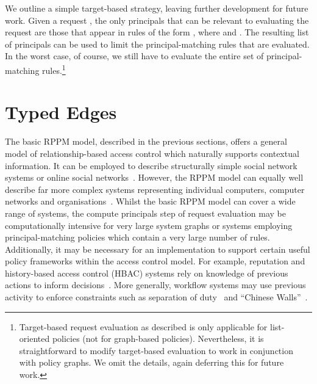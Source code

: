 \documentclass{article}
\begin{document}
We outline a simple target-based strategy, leaving further development for future work.
Given a request , the only principals that can be relevant to evaluating the request are those that appear in rules of the form , where  and .
The resulting list of principals can be used to limit the principal-matching rules that are evaluated.
In the worst case, of course, we still have to evaluate the entire set of principal-matching rules.\footnote{Target-based request evaluation as described is only applicable for list-oriented policies (not for graph-based policies). Nevertheless, it is straightforward to modify target-based evaluation to work in conjunction with policy graphs.  We omit the details, again deferring this for future work.}

\section{Typed Edges}\label{sec:extended_typed_edges}
The basic RPPM model, described in the previous sections, offers a general model of relationship-based access control which naturally supports contextual information.
It can be employed to describe structurally simple social network systems or online social networks~\cite{ChengPS12passat,ChengPS12dbsec,Fong11}.
However, the RPPM model can equally well describe far more complex systems representing individual computers, computer networks and organisations~\cite{CramptonS14}.
Whilst the basic RPPM model can cover a wide range of systems, the compute principals step of request evaluation may be computationally intensive for very large system graphs or systems employing principal-matching policies which contain a very large number of rules.
Additionally, it may be necessary for an implementation to support certain useful policy frameworks within the access control model.
For example, reputation and history-based access control (HBAC) systems rely on knowledge of previous actions to inform decisions~\cite{AbadiF03,EdjlaliAC99,KrukowNS08}.
More generally, workflow systems may use previous activity to enforce constraints such as separation of duty~\cite{GligorGF98,SimonZ97} and ``Chinese Walls''~\cite{BrewerN89}.
\end{document}
